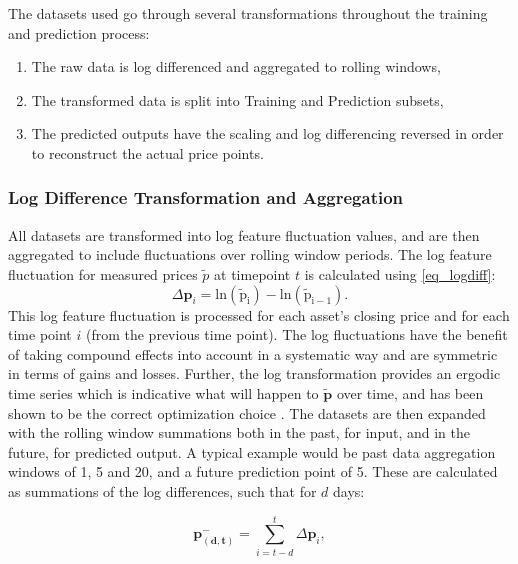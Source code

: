 \documentclass[a4paper,11pt,oneside]{article}
\theoremstyle{plain}
\theoremstyle{definition}
\begin{document}
	The datasets used go through several transformations throughout the training and prediction process:
	
	\begin{enumerate}
		\item The raw data is log differenced and aggregated to rolling windows,
		\item The transformed data is split into Training and Prediction subsets,
		\item The predicted outputs have the scaling and log differencing reversed in order to reconstruct the actual price points.
	\end{enumerate}
		
	\subsubsection{Log Difference Transformation and Aggregation}\label{ldata_og_difference}
	All datasets are transformed into log feature fluctuation values, and are then aggregated to include fluctuations over rolling window periods. The log feature fluctuation for measured prices $\tilde{p}$ at timepoint $t$ is calculated using \eqref{eq_logdiff}:
	\begin{equation}\label{eq_logdiff}
	\Delta\mathbf{p}_i = \mathrm{ln(\tilde{p}_i) - \mathrm{ln}(\tilde{p}_{i-1})} .
	\end{equation}
	This log feature fluctuation is processed for each asset's closing price and for each time point $i$ (from the previous time point). The log fluctuations have the benefit of taking compound effects into account in a systematic way and are symmetric in terms of gains and losses. Further, the log transformation provides an ergodic time series which is indicative what will happen to $\mathbf{\tilde{p}}$ over time, and has been shown to be the correct optimization choice \citep{Peters}.
	\newline\newline
	The datasets are then expanded with the rolling window summations both in the past, for input, and in the future, for predicted output. A typical example would be past data aggregation windows of 1, 5 and 20, and a future prediction point of 5. These are calculated as summations of the log differences, such that for $d$ days:
	
	\begin{equation}\label{eq_price_agg_past}
	 \mathbf{p^{-}_{(d,t)}} = \sum_{i = t-d}^{t} \Delta\mathbf{p}_i , 
	\end{equation}
	
\end{document}
